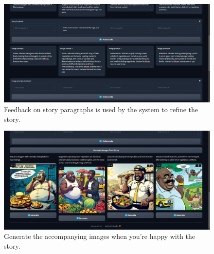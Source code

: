 \begin{figure}[H]
	\centering
	\includegraphics[width=1.0\textwidth]{./graphics/t4.png}
	\caption[System design image pending.]{
Feedback on story paragraphs is used by the system to refine the story.
	\label{fig:system_design}
	}
\end{figure}

\begin{figure}[H]
	\centering
	\includegraphics[width=1.0\textwidth]{./graphics/t5.png}
	\caption[System design image pending.]{
Generate the accompanying images when you're happy with the story.
	\label{fig:system_design}
	}
\end{figure}
